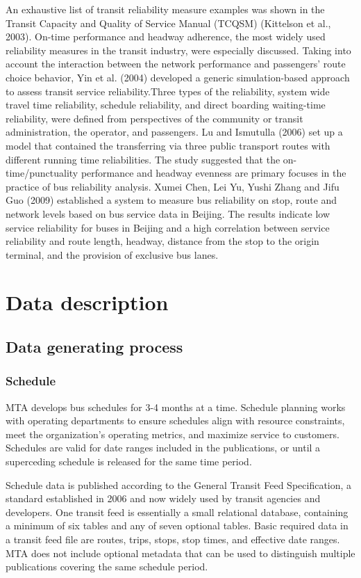 \documentclass[12pt,journal,compsoc]{IEEEtran}
\begin{document}
An exhaustive list of transit reliability measure examples was shown in the Transit Capacity and Quality of Service Manual (TCQSM) (Kittelson et al., 2003). On-time performance and headway adherence, the most widely used reliability measures in the transit industry, were especially discussed.
Taking into account the interaction between the network performance and passengers’ route choice behavior, Yin et al. (2004) developed a generic simulation-based approach to assess transit service reliability.Three types of the reliability, system wide travel time reliability, schedule reliability, and direct boarding waiting-time reliability, were defined from perspectives of the community or transit administration, the operator, and passengers.
Lu and Ismutulla (2006) set up a model that contained the transferring via three public transport routes with different running time reliabilities. The study suggested that the on-time/punctuality performance and headway evenness are primary focuses in the practice of bus reliability analysis.
Xumei Chen, Lei Yu, Yushi Zhang and Jifu Guo (2009) established a system to measure bus reliability on stop, route and network levels based on bus service data in Beijing. The results indicate low service reliability for buses in Beijing and a high correlation between service reliability and route length, headway, distance from the stop to the origin terminal, and the provision of exclusive bus lanes.

\section{Data description}

\subsection{Data generating process}
\subsubsection{Schedule}

MTA develops bus schedules for 3-4 months at a time.  Schedule planning works with operating departments to ensure schedules align with resource constraints, meet the organization’s operating metrics, and maximize service to customers.  Schedules are valid for date ranges included in the publications, or until a superceding schedule is released for the same time period.

Schedule data is published according to the General Transit Feed Specification, a standard established in 2006 and now widely used by transit agencies and developers.  One transit feed is essentially a small relational database, containing a minimum of six tables and any of seven optional tables.  Basic required data in a transit feed file are routes, trips, stops, stop times, and effective date ranges.  MTA does not include optional metadata that can be used to distinguish multiple publications covering the same schedule period.
\end{document}
